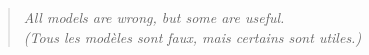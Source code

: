 
\vspace*{3 cm}

\begin{center}

\begin{quote} \textit{\og All models are wrong, but some are useful. \fg{}}\\
\textit{(Tous les modèles sont faux, mais certains sont utiles.)}%
\vspace{0.8\baselineskip} %
 \end{quote}%

\vspace{1.5 cm}







\end{center}
